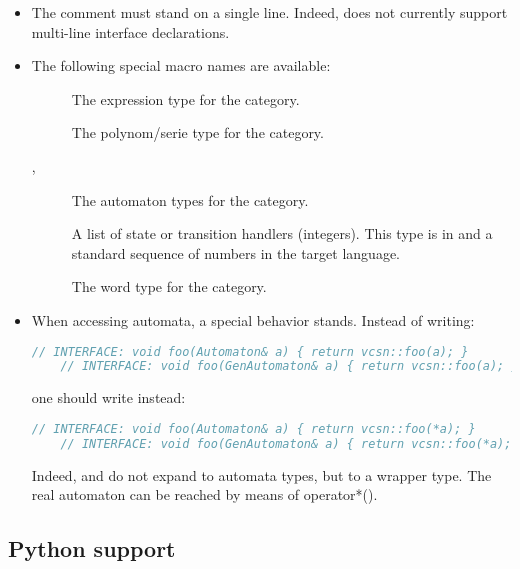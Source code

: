 \begin{itemize}
\item The comment must stand on a single line.  Indeed,
   does not currently support multi-line interface
  declarations.

\item The following special macro names are available:

  \begin{description}
  \item[] The expression type for the category.
  \item[] The polynom/serie type for the category.
  \item[, ] The automaton types for
    the category.
  \item[] A list of state or transition handlers
    (integers). This type is  in \Cxx and a
    standard sequence of numbers in the target language.
  \item[] The word type for the category.
  \end{description}

\item When accessing automata, a special behavior stands. Instead of
  writing:

  \begin{lstlisting}[language=C++]
    // INTERFACE: void foo(Automaton& a) { return vcsn::foo(a); }
    // INTERFACE: void foo(GenAutomaton& a) { return vcsn::foo(a); }
  \end{lstlisting}

  one should write instead:

  \begin{lstlisting}[language=C++]
    // INTERFACE: void foo(Automaton& a) { return vcsn::foo(*a); }
    // INTERFACE: void foo(GenAutomaton& a) { return vcsn::foo(*a); }
  \end{lstlisting}

  Indeed,     and    do   not  expand  to
  \Vauc automata types, but to  a wrapper type. The real automaton
  can be reached by means of operator*().

\end{itemize}

\subsection{Python support}

